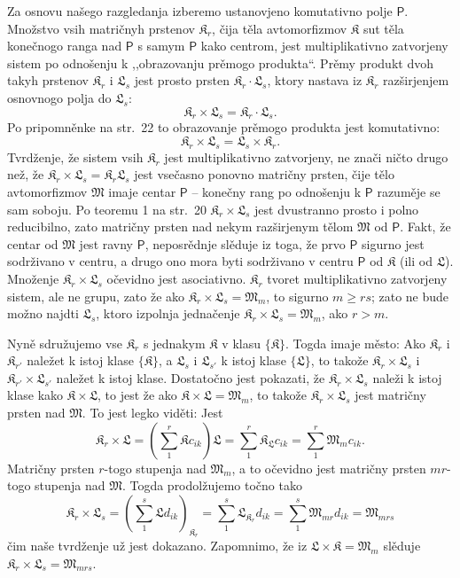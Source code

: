 \documentclass[11pt]{article}
\begin{document}
Za osnovu našego razgledanja izberemo ustanovjeno komutativno polje \(\mathsf P\). Množstvo vsih matričnyh prstenov \(\mathfrak K_r\), čija těla avtomorfizmov \(\mathfrak K\) sut těla konečnogo ranga nad \(\mathsf P\) s samym \(\mathsf P\) kako centrom, jest multiplikativno zatvorjeny sistem po odnošenju k ,,obrazovanju prěmogo produkta``. Prěmy produkt dvoh takyh prstenov \(\mathfrak K_r\) i \(\mathfrak L_s\) jest prosto prsten \(\mathfrak K_r\cdot\mathfrak L_s\), ktory nastava iz \(\mathfrak K_r\) razširjenjem osnovnogo polja do \(\mathfrak L_s\):
\[
\mathfrak K_r\times\mathfrak L_s=\mathfrak K_r\cdot\mathfrak L_s.
\]
Po pripomněnke na str.~22 to obrazovanje prěmogo produkta jest komutativno:
\[
\mathfrak K_r\times\mathfrak L_s=\mathfrak L_s\times\mathfrak K_r.
\]
Tvrdženje, že sistem vsih \(\mathfrak K_r\) jest multiplikativno zatvorjeny, ne znači ničto drugo než, že \(\mathfrak K_r\times\mathfrak L_s=\mathfrak K_r\mathfrak L_s\) jest vsečasno ponovno matričny prsten, čije tělo avtomorfizmov \(\mathfrak M\) imaje centar \(\mathsf P\) -- konečny rang po odnošenju k \(\mathsf P\) razuměje se sam soboju. Po teoremu 1 na str.~20 \(\mathfrak K_r\times\mathfrak L_s\) jest dvustranno prosto i polno reducibilno, zato matričny prsten nad nekym razširjenym tělom \(\mathfrak M\) od \(\mathsf P\). Fakt, že centar od \(\mathfrak M\) jest ravny \(\mathsf P\), neposrědnje slěduje iz toga, že prvo \(\mathsf P\) sigurno jest sodrživano v centru, a drugo ono mora byti sodrživano v centru \(\mathsf P\) od \(\mathfrak K\) (ili od \(\mathfrak L\)). Množenje \(\mathfrak K_r\times\mathfrak L_s\) očevidno jest asociativno. \(\mathfrak K_r\) tvoret multiplikativno zatvorjeny sistem, ale ne grupu, zato že ako \(\mathfrak K_r\times\mathfrak L_s=\mathfrak M_m\), to sigurno \(m\geq rs\); zato ne bude možno najdti \(\mathfrak L_s\), ktoro izpolnja jednačenje \(\mathfrak K_r\times\mathfrak L_s=\mathfrak M_m\), ako \(r>m\).

Nyně sdružujemo vse \(\mathfrak K_r\) s jednakym \(\mathfrak K\) v klasu \(\{\mathfrak K\}\). Togda imaje město: Ako \(\mathfrak K_r\) i \(\mathfrak K_{r'}\) naležet k istoj klase \(\{\mathfrak K\}\), a \(\mathfrak L_s\) i \(\mathfrak L_{s'}\) k istoj klase \(\{\mathfrak L\}\), to takože \(\mathfrak K_r\times\mathfrak L_s\) i \(\mathfrak K_{r'}\times\mathfrak L_{s'}\) naležet k istoj klase. Dostatočno jest pokazati, že \(\mathfrak K_r\times\mathfrak L_s\) naleži k istoj klase kako \(\mathfrak K\times\mathfrak L\), to jest že ako \(\mathfrak K\times\mathfrak L=\mathfrak M_m\), to takože \(\mathfrak K_r\times\mathfrak L_s\) jest matričny prsten nad \(\mathfrak M\). To jest legko viděti: Jest
\[
\mathfrak K_r\times\mathfrak L
=\left(\sum_1^r\mathfrak K c_{ik}\right)\mathfrak L
=\sum_1^r\mathfrak K_{\mathfrak L}c_{ik}
=\sum_1^r\mathfrak M_m c_{ik}.
\]
Matričny prsten \(r\)-togo stupenja nad \(\mathfrak M_m\), a to očevidno jest matričny prsten \(mr\)-togo stupenja nad \(\mathfrak M\). Togda prodolžujemo točno tako
\[
\mathfrak K_r\times\mathfrak L_s
=\left(\sum_1^s\mathfrak L d_{ik}\right)_{\mathfrak K_r}
=\sum_1^s\mathfrak L_{\mathfrak K_r}d_{ik}
=\sum_1^s\mathfrak M_{mr}d_{ik}
=\mathfrak M_{mrs}
\]
čim naše tvrdženje už jest dokazano. Zapomnimo, že iz \(\mathfrak L\times\mathfrak K=\mathfrak M_m\) slěduje \(\mathfrak K_r\times\mathfrak L_s=\mathfrak M_{mrs}\).
\end{document}
